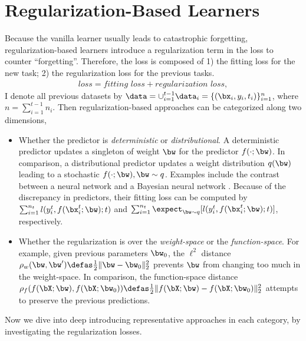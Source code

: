 \section{Regularization-Based Learners}

Because the vanilla learner usually leads to catastrophic forgetting, regularization-based learners introduce a regularization term in the loss to counter “forgetting”. Therefore, the loss is composed of 1) the fitting loss for the new task; 2) the regularization loss for the previous tasks. 
\begin{align}
    \textit{loss} = \textit{fitting loss} + \textit{regularization loss},
\end{align}
I denote all previous datasets by $\data = \cup_{i=1}^{t-1} \data_{i}  = \{(\bx_i, y_i, t_i)\}_{i=1}^{n}$, where $n = \sum_{i=1}^{t-1} n_i$. Then regularization-based approaches can be categorized along two dimensions,
\begin{itemize}
\item Whether the predictor is \emph{deterministic} or \emph{distributional}. A deterministic predictor updates a singleton of weight $\bw$ for the predictor $f(\cdot; \bw)$. In comparison, a distributional predictor updates a weight distribution $q(\bw)$ leading to a stochastic $f(\cdot; \bw), \bw \sim q$.  Examples include the contrast between a neural network and a Bayesian neural network \citep{neal1995bayesian}. Because of the discrepancy in predictors, their fitting loss can be computed by $\sum_{i=1}^{n_t} l(y_i^t, f(\bx_i^t; \bw); t)$ and $\sum_{i=1}^{n_t} \expect_{\bw \sim q} [l(y_i^t, f(\bx_i^t; \bw); t)]$, respectively.
\item Whether the regularization is over the \emph{weight-space} or the \emph{function-space}. For example, given previous parameters $\bw_0$, the $\ell^2$ distance $\rho_w(\bw, \bw') \defas \frac{1}{2}\|\bw - \bw_0\|_2^2$ prevents $\bw$ from changing too much in the weight-space. In comparison, the function-space distance $\rho_f(f(\bX; \bw), f(\bX; \bw_0)) \defas \frac{1}{2}\|f(\bX; \bw)-f(\bX; \bw_0)\|_2^2$ attempts to preserve the previous  predictions. 
\end{itemize}
Now we dive into deep introducing representative approaches in each category, by investigating the regularization losses.


